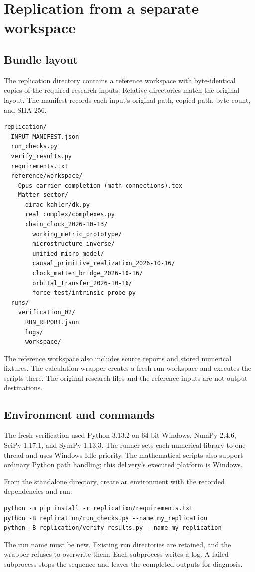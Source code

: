 \section{Replication from a separate workspace}
\label{sec:replication}

\subsection{Bundle layout}

The replication directory contains a reference workspace with byte-identical copies of the required research inputs. Relative directories match the original layout. The manifest records each input's original path, copied path, byte count, and SHA-256.

\begin{Verbatim}[fontsize=\small]
replication/
  INPUT_MANIFEST.json
  run_checks.py
  verify_results.py
  requirements.txt
  reference/workspace/
    Opus carrier completion (math connections).tex
    Matter sector/
      dirac kahler/dk.py
      real complex/complexes.py
      chain_clock_2026-10-13/
        working_metric_prototype/
        microstructure_inverse/
        unified_micro_model/
        causal_primitive_realization_2026-10-16/
        clock_matter_bridge_2026-10-16/
        orbital_transfer_2026-10-16/
        force_test/intrinsic_probe.py
  runs/
    verification_02/
      RUN_REPORT.json
      logs/
      workspace/
\end{Verbatim}

The reference workspace also includes source reports and stored numerical fixtures. The calculation wrapper creates a fresh run workspace and executes the scripts there. The original research files and the reference inputs are not output destinations.

\subsection{Environment and commands}

The fresh verification used Python 3.13.2 on 64-bit Windows, NumPy 2.4.6, SciPy 1.17.1, and SymPy 1.13.3. The runner sets each numerical library to one thread and uses Windows Idle priority. The mathematical scripts also support ordinary Python path handling; this delivery's executed platform is Windows.

From the standalone directory, create an environment with the recorded dependencies and run:
\begin{Verbatim}[fontsize=\small]
python -m pip install -r replication/requirements.txt
python -B replication/run_checks.py --name my_replication
python -B replication/verify_results.py --name my_replication
\end{Verbatim}
The run name must be new. Existing run directories are retained, and the wrapper refuses to overwrite them. Each subprocess writes a log. A failed subprocess stops the sequence and leaves the completed outputs for diagnosis.

